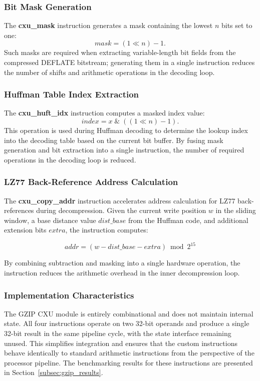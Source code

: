 \subsubsection{Bit Mask Generation}

The \textbf{cxu\_mask} instruction generates a mask containing the lowest $n$ bits set
to one:
$$
mask = (1 \ll n) - 1.
$$
Such masks are required when extracting variable-length bit fields from the compressed
DEFLATE bitstream; generating them in a single instruction reduces the number of shifts
and arithmetic operations in the decoding loop.

\subsubsection{Huffman Table Index Extraction}

The \textbf{cxu\_huft\_idx} instruction computes a masked index value:
$$
index = x \;\&\; ((1 \ll n) - 1).
$$
This operation is used during Huffman decoding to determine the lookup index into the
decoding table based on the current bit buffer.
By fusing mask generation and bit extraction into a single instruction, the number of
required operations in the decoding loop is reduced.

\subsubsection{LZ77 Back-Reference Address Calculation}

The \textbf{cxu\_copy\_addr} instruction accelerates address calculation for LZ77
back-references during decompression.
Given the current write position $w$ in the sliding window, a base distance value
$dist\_base$ from the Huffman code, and additional extension bits $extra$, the
instruction computes:

$$
addr = (w - dist\_base - extra) \bmod 2^{15}
$$

By combining subtraction and masking into a single hardware operation, the instruction
reduces the arithmetic overhead in the inner decompression loop.

\subsubsection{Implementation Characteristics}

The GZIP CXU module is entirely combinational and does not maintain internal state.
All four instructions operate on two 32-bit operands and produce a single 32-bit result
in the same pipeline cycle, with the state interface remaining unused.
This simplifies integration and ensures that the custom instructions behave identically
to standard arithmetic instructions from the perspective of the processor pipeline.
The benchmarking results for these instructions are presented in
Section~\ref{subsec:gzip_results}.

